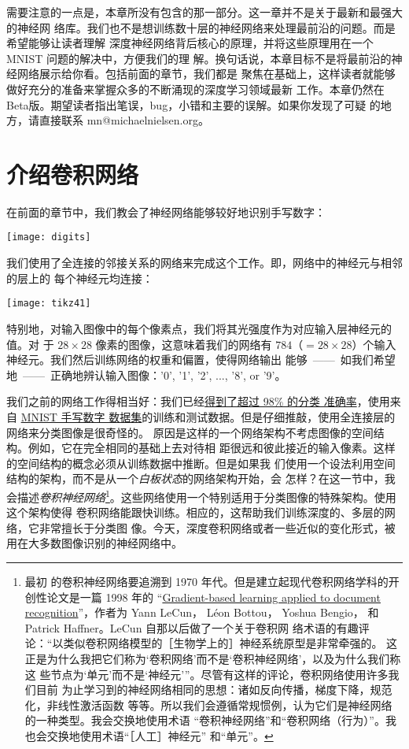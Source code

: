需要注意的一点是，本章所没有包含的那一部分。这一章并不是关于最新和最强大的神经网
络库。我们也不是想训练数十层的神经网络来处理最前沿的问题。而是希望能够让读者理解
深度神经网络背后核心的原理，并将这些原理用在一个 MNIST 问题的解决中，方便我们的理
解。换句话说，本章目标不是将最前沿的神经网络展示给你看。包括前面的章节，我们都是
聚焦在基础上，这样读者就能够做好充分的准备来掌握众多的不断涌现的深度学习领域最新
工作。本章仍然在Beta版。期望读者指出笔误，bug，小错和主要的误解。如果你发现了可疑
的地方，请直接联系 mn@michaelnielsen.org。

\section{介绍卷积网络}
\label{sec:convolutional_networks}

在前面的章节中，我们教会了神经网络能够较好地识别手写数字：
\begin{center}
  \texttt{[image: digits]}
\end{center}

我们使用了全连接的邻接关系的网络来完成这个工作。即，网络中的神经元与相邻的层上的
每个神经元均连接：
\begin{center}
  \texttt{[image: tikz41]}
\end{center}

特别地，对输入图像中的每个像素点，我们将其光强度作为对应输入层神经元的值。对
于 $28 \times 28$ 像素的图像，这意味着我们的网络有
$784$（$= 28 \times 28$）个输入神经元。我们然后训练网络的权重和偏置，使得网络输出
能够~——~如我们希望地~——~正确地辨认输入图像：'0', '1', '2', ..., '8', or '9'。

我们之前的网络工作得相当好：我们已经\hyperref[98percent]{得到了超过 98\% 的分类
  准确率}，使用来自 \hyperref[sec:learning_with_gradient_descent]{MNIST 手写数字
  数据集}的训练和测试数据。但是仔细推敲，使用全连接层的网络来分类图像是很奇怪的。
原因是这样的一个网络架构不考虑图像的空间结构。例如，它在完全相同的基础上去对待相
距很远和彼此接近的输入像素。这样的空间结构的概念必须从训练数据中推断。但是如果我
们使用一个设法利用空间结构的架构，而不是从一个\emph{白板状态}的网络架构开始，会
怎样？在这一节中，我会描述\emph{卷积神经网络}\footnote{最初
  的卷积神经网络要追溯到 1970 年代。但是建立起现代卷积网络学科的开创性论文是一篇
  1998 年的
  “\href{http://yann.lecun.com/exdb/publis/pdf/lecun-98.pdf}{Gradient-based
    learning applied to document recognition}”，作者为 Yann LeCun， Léon
  Bottou， Yoshua Bengio， 和 Patrick Haffner。LeCun 自那以后做了一个关于卷积网
  络术语的有趣评论：“以类似卷积网络模型的［生物学上的］神经系统原型是非常牵强的。
  这正是为什么我把它们称为‘卷积网络’而不是‘卷积神经网络’，以及为什么我们称这
  些节点为‘单元’而不是‘神经元’”。尽管有这样的评论，卷积网络使用许多我们目前
  为止学习到的神经网络相同的思想：诸如反向传播，梯度下降，规范化，非线性激活函数
  等等。所以我们会遵循常规惯例，认为它们是神经网络的一种类型。我会交换地使用术语
  “卷积神经网络”和“卷积网络（行为）”。我也会交换地使用术语“［人工］神经元”
  和“单元”。}。这些网络使用一个特别适用于分类图像的特殊架构。使用这个架构使得
卷积网络能跟快训练。相应的，这帮助我们训练深度的、多层的网络，它非常擅长于分类图
像。今天，深度卷积网络或者一些近似的变化形式，被用在大多数图像识别的神经网络中。

